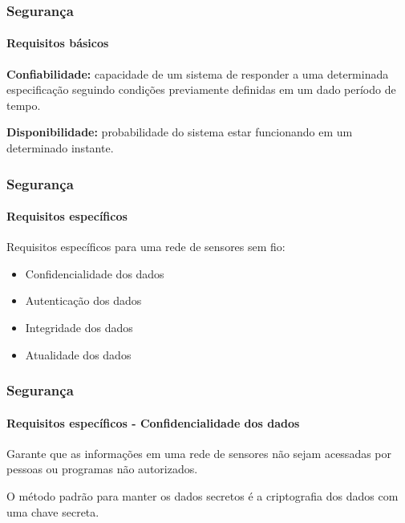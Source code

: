 \documentclass[notes]{beamer}
\begin{document}
\begin{frame}
\label{slide_64}
\frametitle{Segurança}
\framesubtitle{Requisitos básicos}

\begin{block}

\textbf{Confiabilidade:} capacidade de um sistema de responder a uma determinada especificação seguindo condições previamente definidas em um dado período de tempo.

\end{block} \pause

\begin{block}

\textbf{Disponibilidade:} probabilidade do sistema estar funcionando em um determinado instante.

\end{block}

\end{frame}

\begin{frame}
\label{slide_65}
\frametitle{Segurança}
\framesubtitle{Requisitos específicos}

\begin{block}

Requisitos específicos para uma rede de sensores sem fio: \pause

\begin{itemize}

\item Confidencialidade dos dados \pause
\item Autenticação dos dados \pause
\item Integridade dos dados \pause
\item Atualidade dos dados

\end{itemize}

\end{block} 

\end{frame}

\begin{frame}
\label{slide_66}
\frametitle{Segurança}
\framesubtitle{Requisitos específicos - Confidencialidade dos dados}

\begin{block}

Garante que as informações em uma rede de sensores não sejam acessadas por pessoas ou programas não autorizados. 
\end{block} \pause

\begin{block}

O método padrão para manter os dados secretos é a criptografia dos dados com uma chave secreta.

\end{block} 

\end{frame}
\end{document}
